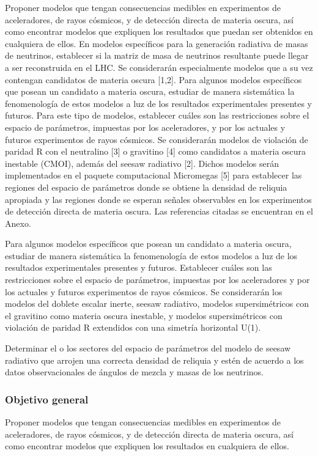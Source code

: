Proponer modelos que tengan consecuencias medibles en experimentos de aceleradores, de rayos cósmicos, y de detección directa de materia oscura, así como encontrar modelos que expliquen los resultados que puedan ser obtenidos en cualquiera de ellos. En modelos específicos para la generación radiativa de masas de neutrinos, establecer si la matriz de masa de neutrinos resultante puede llegar a ser reconstruida en el LHC. Se considerarán especialmente modelos que a su vez contengan candidatos de materia oscura [1,2]. Para algunos modelos específicos que posean un candidato a materia oscura, estudiar de manera sistemática la fenomenología de estos modelos a luz de los resultados experimentales presentes y futuros. Para este tipo de modelos, establecer cuáles son las restricciones sobre el espacio de parámetros, impuestas por los aceleradores, y por los actuales y futuros experimentos de rayos cósmicos. Se considerarán modelos de violación de paridad R con el neutralino [3] o gravitino [4] como candidatos a materia oscura inestable (CMOI), además del seesaw radiativo [2]. Dichos modelos serán implementados en el paquete computacional Micromegas [5] para establecer las regiones del espacio de parámetros donde se obtiene la densidad de reliquia apropiada y las regiones donde se esperan señales observables en los experimentos de detección directa de materia oscura. Las referencias citadas se encuentran en el Anexo.

\newpage{}

Para algunos modelos específicos que posean un candidato a materia oscura, estudiar de manera sistemática la fenomenología de estos modelos a luz de los resultados experimentales presentes y futuros. Establecer cuáles son las restricciones sobre el espacio de parámetros, impuestas por los aceleradores y por los actuales y futuros experimentos de rayos cósmicos. Se considerarán los modelos del doblete escalar inerte,  seesaw radiativo, modelos supersimétricos con el gravitino como materia oscura inestable,  y modelos supersimétricos con violación de paridad R extendidos con una simetría horizontal U(1).



Determinar el o los sectores del espacio de parámetros del modelo de seesaw radiativo que arrojen una correcta densidad 
de reliquia y estén de acuerdo a los datos observacionales de ángulos de mezcla y masas de los neutrinos.	



\subsubsection{Objetivo general}
Proponer modelos que tengan consecuencias medibles en experimentos de aceleradores, de rayos cósmicos, y de detección directa de materia oscura, así como encontrar modelos que expliquen los resultados en cualquiera de ellos. 


